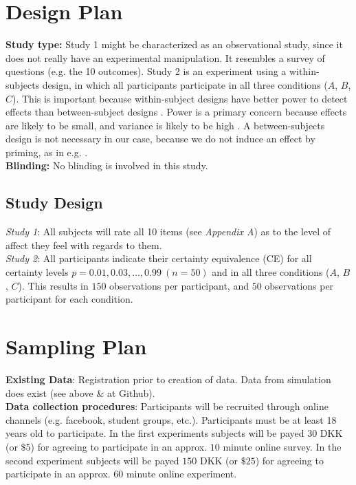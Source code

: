 \documentclass[12pt]{article}
\begin{document}
 \section{Design Plan}

\textbf{Study type:} Study 1 might be characterized
as an observational study, since it does not
really have an experimental manipulation. It
resembles a survey of questions (e.g. the 10
outcomes). Study 2 is an experiment using a
within-subjects design, in which all participants
participate in all three conditions ($A$,  $B$,  $C$).
This is important because within-subject designs
have better power to detect effects than
between-subject designs
\autocite{charness2012experimental}. Power is a
primary concern because effects are likely
to be small, and variance is likely to be high
\autocite{gonzalez1999shape}. A between-subjects
design is not necessary in our case, because we do
not induce an effect by priming, as in e.g.
\textcite{hsee2004music}. \\

\textbf{Blinding:} No blinding is involved in this study. \\

\subsection{Study Design}

\emph{Study 1}: All subjects will rate all 10 items
(see \emph{Appendix A}) as to the level of affect they
feel with regards to them. \\

\emph{Study 2}: All participants
indicate their certainty equivalence (CE) for all
certainty levels $p = 0.01, 0.03, \ldots, 0.99 \: (n = 50)$
and in all three conditions ($A$,  $B$,  $C$).
This results in $150$ observations per participant,
and  $50$ observations per participant for each
condition.

\section{Sampling Plan}

\textbf{Existing Data}: Registration prior
to creation of data. Data from simulation
does exist (see above \& at Github). \\

\textbf{Data collection procedures}:
Participants will be recruited through online
channels (e.g. facebook, student groups, etc.).
Participants must be at least 18 years old to
participate. In the first experiments subjects
will be payed $30$ DKK (or $\$5$)
for agreeing to participate
in an approx. $10$ minute online survey. In the
second experiment subjects will be payed $150$ DKK
(or $\$25$)
for agreeing to participate in an approx. $60$ minute
online experiment. \\
\end{document}

